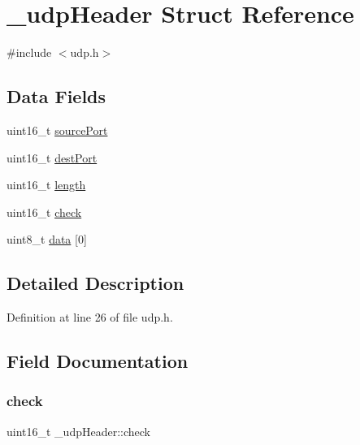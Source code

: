 \hypertarget{struct__udpHeader}{}\section{\+\_\+udp\+Header Struct Reference}
\label{struct__udpHeader}


{\ttfamily \#include $<$udp.\+h$>$}

\subsection*{Data Fields}
\begin{DoxyCompactItemize}
\item 
uint16\+\_\+t \hyperlink{struct__udpHeader_a318d6c6ebbb78b96e79451807b7187ec}{source\+Port}
\item 
uint16\+\_\+t \hyperlink{struct__udpHeader_ad654bb71024cb9833c01f3a563ff5f65}{dest\+Port}
\item 
uint16\+\_\+t \hyperlink{struct__udpHeader_a912e28858fbe7c6e92821bb7c0e8f93d}{length}
\item 
uint16\+\_\+t \hyperlink{struct__udpHeader_a2f371a5a061e0167174a293c4ef427fd}{check}
\item 
uint8\+\_\+t \hyperlink{struct__udpHeader_a1723bc19d441508c0cf4a9f506f37d68}{data} \mbox{[}0\mbox{]}
\end{DoxyCompactItemize}


\subsection{Detailed Description}


Definition at line 26 of file udp.\+h.



\subsection{Field Documentation}
\mbox{\label{struct__udpHeader_a2f371a5a061e0167174a293c4ef427fd}} 
\subsubsection{\texorpdfstring{check}{check}}
{\footnotesize\ttfamily uint16\+\_\+t \+\_\+udp\+Header\+::check}



